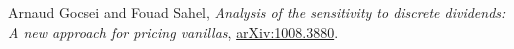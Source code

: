 \documentclass[12pt]{article}
\begin{document}
\begin{thebibliography}{99}
    Arnaud Gocsei and Fouad Sahel,
    {\it Analysis of the sensitivity to discrete dividends: A new approach for pricing vanillas},
    \href{https://arxiv.org/pdf/1008.3880.pdf}{arXiv:1008.3880}.
\end{thebibliography}
\end{document}
